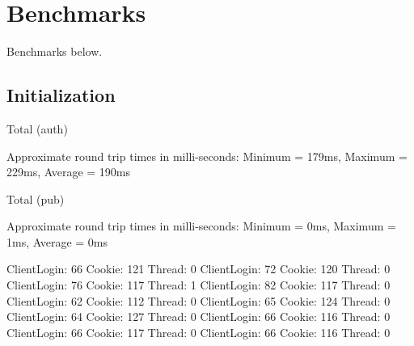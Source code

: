 \section{Benchmarks}
Benchmarks below.

\subsection{Initialization}

Total (auth)

Approximate round trip times in milli-seconds:
	Minimum = 179ms, Maximum = 229ms, Average = 190ms
	
Total (pub)

Approximate round trip times in milli-seconds:
	Minimum = 0ms, Maximum = 1ms, Average = 0ms
	
ClientLogin: 66
Cookie: 121
Thread: 0
ClientLogin: 72
Cookie: 120
Thread: 0
ClientLogin: 76
Cookie: 117
Thread: 1
ClientLogin: 82
Cookie: 117
Thread: 0
ClientLogin: 62
Cookie: 112
Thread: 0
ClientLogin: 65
Cookie: 124
Thread: 0
ClientLogin: 64
Cookie: 127
Thread: 0
ClientLogin: 66
Cookie: 116
Thread: 0
ClientLogin: 66
Cookie: 117
Thread: 0
ClientLogin: 66
Cookie: 116
Thread: 0